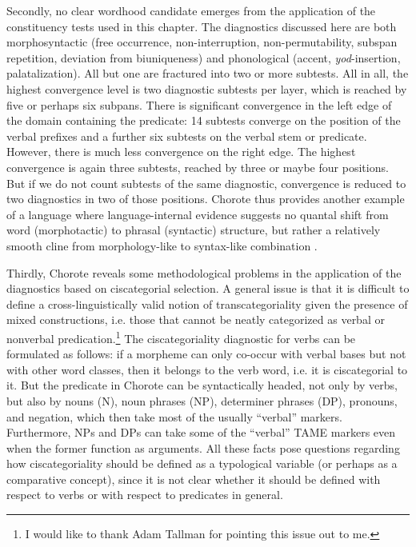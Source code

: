 \documentclass[output=paper]{langscibook}
\begin{document}
Secondly, no clear wordhood candidate emerges from the application of the constituency tests used in this chapter. The diagnostics discussed here are both morphosyntactic (free occurrence, non-interruption, non-permutability, subspan repetition, deviation from biuniqueness) and phonological (accent, \textit{yod}-insertion, palatalization). All but one are fractured into two or more subtests. All in all, the highest convergence level is two diagnostic subtests per layer, which is reached by five or perhaps six subpans. There is significant convergence in the left edge of the domain containing the predicate: 14 subtests converge on the position of the verbal prefixes and a further six subtests on the verbal stem or predicate. However, there is much less convergence on the right edge. The highest convergence is again three subtests, reached by three or maybe four positions. But if we do not count subtests of the same diagnostic, convergence is reduced to two diagnostics in two of those positions. Chorote thus provides another example of a language where language-internal evidence suggests no quantal shift from word (morphotactic) to phrasal (syntactic) structure, but rather a relatively smooth cline from morphology-like to syntax-like combination \citep{Tallman2021}.

Thirdly, Chorote reveals some methodological problems in the application of the diagnostics based on ciscategorial selection. A general issue is that it is difficult to define a cross-linguistically valid notion of transcategoriality given the presence of mixed constructions, i.e. those that cannot be neatly categorized as verbal or nonverbal predication.\footnote{I would like to thank Adam  Tallman for pointing this issue out to me.} The ciscategoriality diagnostic for verbs can be formulated as follows: if a morpheme can only co-occur with verbal bases but not with other word classes, then it belongs to the verb word, i.e. it is ciscategorial to it. But the predicate in Chorote can be syntactically headed, not only by verbs, but also by nouns (N), noun phrases (NP), determiner phrases (DP), pronouns, and negation, which then take most of the usually ``verbal'' markers. Furthermore, NPs and DPs can take some of the ``verbal'' TAME markers even when the former function as arguments. All these facts pose questions regarding how ciscategoriality should be defined as a typological variable (or perhaps as a comparative concept), since it is not clear whether it should be defined with respect to verbs or with respect to predicates in general.
\end{document}
